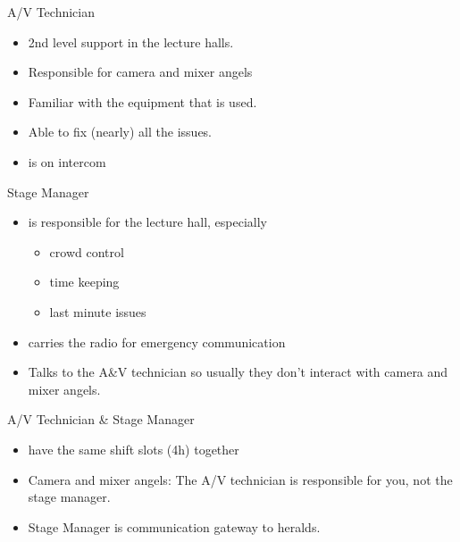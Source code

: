 \documentclass[aspectratio=169]{beamer}
\begin{document}
\begin{frame}{A/V Technician}
	\begin{itemize}
		\item 2nd level support in the lecture halls. 
		\item Responsible for camera and mixer angels
		\item Familiar with the equipment that is used. 
		\item Able to fix (nearly) all the issues. 
		\item is on intercom %
	\end{itemize}
\end{frame}


\begin{frame}{Stage Manager}
\begin{itemize}
	\item is responsible for the lecture hall, especially
	\begin{itemize}
		\item crowd control
		\item time keeping
		\item last minute issues 
	\end{itemize}
	\item carries the radio for emergency communication
	\item Talks to the A&V technician so usually they don't  interact with camera and mixer angels.
\end{itemize}
\end{frame}

\begin{frame}{A/V Technician \& Stage Manager}
\begin{itemize}
	\item have the same shift slots (4h) together
	\item Camera and mixer angels: The A/V technician is responsible for you, not the stage manager.
	\item Stage Manager is communication gateway to heralds.
\end{itemize}
\end{frame}
\end{document}
